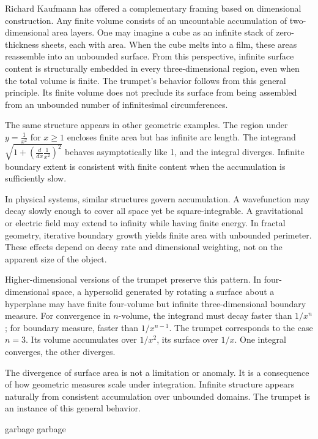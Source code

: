 Richard Kaufmann has offered a complementary framing based on dimensional construction. Any finite volume consists of an uncountable accumulation of two-dimensional area layers. One may imagine a cube as an infinite stack of zero-thickness sheets, each with area. When the cube melts into a film, these areas reassemble into an unbounded surface. From this perspective, infinite surface content is structurally embedded in every three-dimensional region, even when the total volume is finite. The trumpet’s behavior follows from this general principle. Its finite volume does not preclude its surface from being assembled from an unbounded number of infinitesimal circumferences.

The same structure appears in other geometric examples. The region under \( y = \frac{1}{x^2} \) for \( x \geq 1 \) encloses finite area but has infinite arc length. The integrand \( \sqrt{1 + \left( \frac{d}{dx} \frac{1}{x^2} \right)^2} \) behaves asymptotically like 1, and the integral diverges. Infinite boundary extent is consistent with finite content when the accumulation is sufficiently slow.

In physical systems, similar structures govern accumulation. A wavefunction may decay slowly enough to cover all space yet be square-integrable. A gravitational or electric field may extend to infinity while having finite energy. In fractal geometry, iterative boundary growth yields finite area with unbounded perimeter. These effects depend on decay rate and dimensional weighting, not on the apparent size of the object.

Higher-dimensional versions of the trumpet preserve this pattern. In four-dimensional space, a hypersolid generated by rotating a surface about a hyperplane may have finite four-volume but infinite three-dimensional boundary measure. For convergence in \( n \)-volume, the integrand must decay faster than \( 1/x^n \); for boundary measure, faster than \( 1/x^{n-1} \). The trumpet corresponds to the case \( n = 3 \). Its volume accumulates over \( 1/x^2 \), its surface over \( 1/x \). One integral converges, the other diverges.

The divergence of surface area is not a limitation or anomaly. It is a consequence of how geometric measures scale under integration. Infinite structure appears naturally from consistent accumulation over unbounded domains. The trumpet is an instance of this general behavior.

\clearpage
garbage
\clearpage
garbage
\clearpage